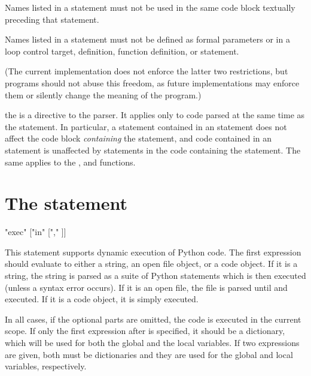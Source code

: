 Names listed in a  statement must not be used in the same
code block textually preceding that  statement.

Names listed in a  statement must not be defined as formal
parameters or in a  loop control target, 
definition, function definition, or  statement.

(The current implementation does not enforce the latter two
restrictions, but programs should not abuse this freedom, as future
implementations may enforce them or silently change the meaning of the
program.)

the  is a directive to the parser.  It
applies only to code parsed at the same time as the 
statement.  In particular, a  statement contained in an
 statement does not affect the code block \emph{containing}
the  statement, and code contained in an 
statement is unaffected by  statements in the code
containing the  statement.  The same applies to the
,  and  functions.


\section{The  statement \label{exec}}

\begin{productionlist}
             {"exec" 
              ["in"  ["," ]]}
\end{productionlist}

This statement supports dynamic execution of Python code.  The first
expression should evaluate to either a string, an open file object, or
a code object.  If it is a string, the string is parsed as a suite of
Python statements which is then executed (unless a syntax error
occurs).  If it is an open file, the file is parsed until \EOF{} and
executed.  If it is a code object, it is simply executed.

In all cases, if the optional parts are omitted, the code is executed
in the current scope.  If only the first expression after 
is specified, it should be a dictionary, which will be used for both
the global and the local variables.  If two expressions are given,
both must be dictionaries and they are used for the global and local
variables, respectively.

